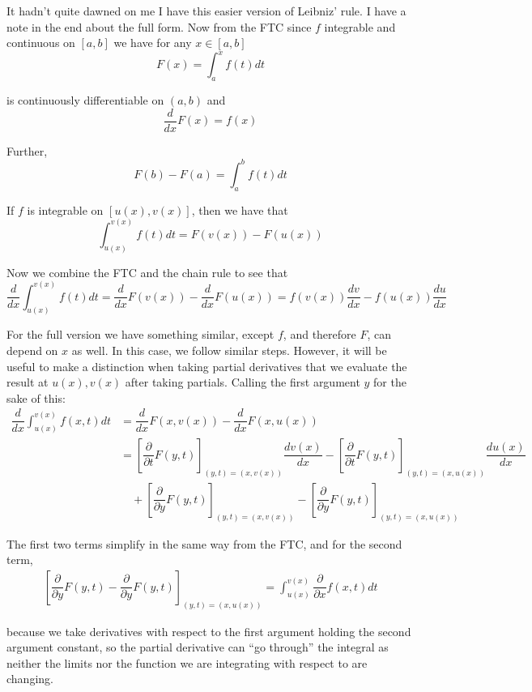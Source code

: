 \documentclass{article}
\begin{document}
\begin{enumerate}[1.]
    \solution It hadn't quite dawned on me I have this easier version of Leibniz' rule. I have a note in the end about the full form. Now from the FTC since $f$ integrable and continuous on $[a, b]$ we have for any $x \in [a, b]$
    \[
      F(x) = \int_{a}^{x} f(t) dt
    \]

    is continuously differentiable on $(a, b)$ and
    \[
      \dfrac{d}{dx} F(x) = f(x)
    \]

    Further,
    \[
      F(b) - F(a) = \int_{a}^{b} f(t) dt
    \]

    If $f$ is integrable on $[u(x), v(x)]$, then we have that
    \[
      \int_{u(x)}^{v(x)} f(t) dt
      =
      F(v(x)) - F(u(x))
    \]

    Now we combine the FTC and the chain rule to see that
    \[
      \dfrac{d}{dx} \int_{u(x)}^{v(x)} f(t) dt
      =
      \dfrac{d}{dx} F(v(x)) - \dfrac{d}{dx} F(u(x))
      =
      f(v(x)) \dfrac{dv}{dx} - f(u(x)) \dfrac{du}{dx}
    \]

    For the full version we have something similar, except $f$, and therefore $F$, can depend on $x$ as well. In this case, we follow similar steps. However, it will be useful to make a distinction when taking partial derivatives that we evaluate the result at $u(x), v(x)$ after taking partials. Calling the first argument $y$ for the sake of this:
    \begin{align*}
      \dfrac{d}{dx} \int_{u(x)}^{v(x)} f(x, t) dt
      &
      =
      \dfrac{d}{dx}
      F(x, v(x))
      -
      \dfrac{d}{dx}
      F(x, u(x))
      \\
      &
      =
      \left[
        \dfrac{\partial}{\partial t} F(y, t)
      \right]_{(y, t) = (x, v(x))}
      \dfrac{dv(x)}{dx}
      -
      \left[
        \dfrac{\partial}{\partial t} F(y, t)
      \right]_{(y, t) = (x, u(x))}
      \dfrac{du(x)}{dx}
      \\
      &
      \quad
      +
      \left[
        \dfrac{\partial}{\partial y}
        F(y, t)
      \right]_{(y, t) = (x, v(x))}
      -
      \left[
        \dfrac{\partial}{\partial y}
        F(y, t)
      \right]_{(y, t) = (x, u(x))}
    \end{align*}

    The first two terms simplify in the same way from the FTC, and for the second term,
    \begin{align*}
      \left[
        \dfrac{\partial}{\partial y}
        F(y, t)
        -
        \dfrac{\partial}{\partial y}
        F(y, t)
      \right]_{(y, t) = (x, u(x))}
      =
      \int_{u(x)}^{v(x)} 
      \dfrac{\partial}{\partial x} f(x, t) dt
    \end{align*}

    because we take derivatives with respect to the first argument holding the second argument constant, so the partial derivative can ``go through'' the integral as neither the limits nor the function we are integrating with respect to are changing.
\end{enumerate}

\end{document}
